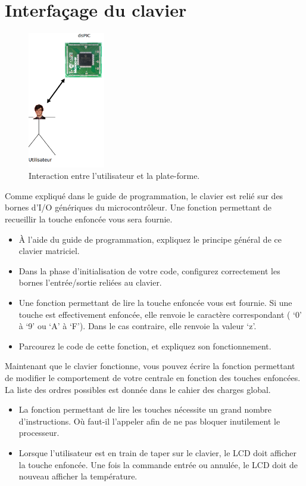 \documentclass[11pt,a4paper]{article}
\theoremstyle{definition}%
\begin{document}
\section{Interfaçage du clavier}
\begin{figure}[H]
\center
\includegraphics[width=0.3\textwidth]{utilisateur}
\caption{Interaction entre l'utilisateur et la plate-forme.}
\label{fig:user}
\end{figure}

Comme expliqué dans le guide de programmation, le clavier est relié sur des bornes d’I/O génériques du microcontrôleur.
Une fonction permettant de recueillir la touche enfoncée vous sera fournie.

\begin{itemize}
	\item À l’aide du guide de programmation, expliquez le principe général de ce clavier matriciel.
	\item Dans la phase d’initialisation de votre code, configurez correctement les bornes l’entrée/sortie reliées au clavier.
	\item Une fonction permettant de lire la touche enfoncée vous est fournie.
	Si une touche est effectivement enfoncée, elle renvoie le caractère correspondant ( ‘0’ à ‘9’ ou ‘A’ à ‘F’).
	Dans le cas contraire, elle renvoie la valeur ‘z’.
	\item Parcourez le code de cette fonction, et expliquez son fonctionnement.
\end{itemize}

Maintenant que le clavier fonctionne, vous pouvez écrire la fonction permettant de modifier le comportement de votre centrale en fonction des touches enfoncées.
La liste des ordres possibles est donnée dans le cahier des charges global.
\begin{itemize}
	\item La fonction permettant de lire les touches nécessite un grand nombre d’instructions.
	Où faut-il l’appeler afin de ne pas bloquer inutilement le processeur.
	\item Lorsque l’utilisateur est en train de taper sur le clavier, le LCD doit afficher la touche enfoncée.
	Une fois la commande entrée ou annulée, le LCD doit de nouveau afficher la température.
\end{itemize}
\end{document}
